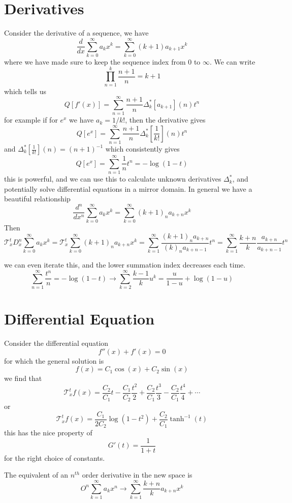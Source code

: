 \documentclass{article}
\begin{document}
\section{Derivatives}
Consider the derivative of a sequence, we have 
$$
\frac{d}{dx} \sum_{k=0}^\infty a_k x^k = \sum_{k=0}^\infty (k+1)a_{k+1}x^k
$$
where we have made sure to keep the sequence index from $0$ to $\infty$. We can write 
$$
\prod_{n=1}^k \frac{n+1}{n} = k+1
$$
which tells us
$$
Q[f'(x)] = \sum_{n=1}^\infty \frac{n+1}{n} \Delta^*_k[a_{k+1}](n) t^n
$$
for example if for $e^x$ we have $a_k = 1/k!$, then the derivative gives
$$
Q[e^x] = \sum_{n=1}^\infty \frac{n+1}{n} \Delta^*_k[\frac{1}{k!}](n) t^n
$$
and $\Delta^*_k[\frac{1}{k!}](n) = (n+1)^{-1}$ which consistently gives
$$
Q[e^x] = \sum_{n=1}^\infty \frac{1}{n} t^n = -\log(1-t)
$$
this is powerful, and we can use this to calculate unknown derivatives $\Delta^*_k$, and potentially solve differential equations in a mirror domain. In general we have a beautiful relationship
$$
\frac{d^n}{dx^n} \sum_{k=0}^\infty a_k x^k = \sum_{k=0}^\infty (k+1)_n a_{k+n}x^k
$$
Then
$$
\mathcal{T}_x^t D_x^n \sum_{k=0}^\infty a_k x^k = \mathcal{T}_x^t \sum_{k=0}^\infty (k+1)_n a_{k+n}x^k = \sum_{k=1}^\infty \frac{(k+1)_n a_{k+n}}{(k)_n a_{k+n-1}} t^n = \sum_{k=1}^\infty \frac{k+n}{k}\frac{a_{k+n}}{a_{k+n-1}} t^n
$$



we can even iterate this, and the lower summation index decreases each time.
$$
\sum_{n=1}^\infty \frac{t^n}{n} = -\log(1-t) \to \sum_{k=2}^\infty \frac{k-1}{k} u^k = \frac{u}{1-u} + \log(1-u)
$$

\section{Differential Equation}
Consider the differential equation 
$$
f''(x) + f'(x) = 0
$$
for which the general solution is 
$$
f(x) = C_1 \cos(x) + C_2 \sin(x)
$$
we find that 
$$
\mathcal{T}_x^t f(x) =  \frac{C_2}{C_1}t - \frac{C_1}{C_2}\frac{t^2}{2} + \frac{C_2}{C_1}\frac{t^3}{3} - \frac{C_2}{C_1}\frac{t^4}{4}+\cdots
$$
or
$$
\mathcal{T}_x^t f(x) = \frac{C_1}{2C_2} \log(1-t^2) + \frac{C_2}{C_1} \tanh^{-1}(t)
$$
this has the nice property of 
$$
G'(t) =\frac{1}{1+t}
$$
for the right choice of constants.


The equivalent of an $n^{th}$ order derivative in the new space is 
$$
O^n \sum_{k=1}^\infty a_k x^n \to \sum_{k=1}^\infty \frac{k+n}{k}a_{k+n} x^k
$$
\end{document}
